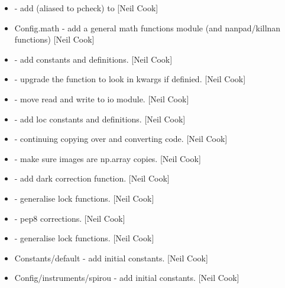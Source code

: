 \documentclass[a4paper,10pt,english]{report}
\begin{document}
\begin{itemize}
\item {} 
 - add  (aliased to pcheck) to 
{[}Neil Cook{]}

\item {} 
Config.math - add a general math functions module (and nanpad/killnan
functions) {[}Neil Cook{]}

\item {} 
 - add  constants and
definitions. {[}Neil Cook{]}

\item {} 
 - upgrade the  function to look in kwargs if
definied. {[}Neil Cook{]}

\item {} 
 - move read and write to io module. {[}Neil Cook{]}

\item {} 
 - add loc constants and definitions. {[}Neil
Cook{]}

\item {} 
 - continuing copying over and converting code. {[}Neil
Cook{]}

\item {} 
 - make sure images are np.array copies. {[}Neil
Cook{]}

\item {} 
 - add dark correction function. {[}Neil Cook{]}

\item {} 
 - generalise lock functions. {[}Neil Cook{]}

\item {} 
 - pep8 corrections. {[}Neil Cook{]}

\item {} 
 - generalise lock functions. {[}Neil Cook{]}

\item {} 
Constants/default - add initial  constants. {[}Neil Cook{]}

\item {} 
Config/instruments/spirou - add initial  constants. {[}Neil Cook{]}


\end{itemize}
\end{document}
